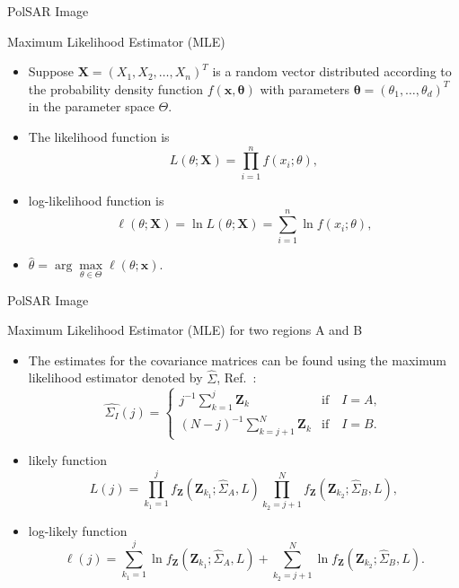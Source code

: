 \documentclass[10pt]{beamer}
\begin{document}
\begin{frame}[fragile]{PolSAR Image}
\begin{alertblock}{Maximum Likelihood Estimator (MLE)}
\begin{itemize}
	\item Suppose $\mathbf{X}=(X_1,X_2,\dots,X_n)^T$ is a random vector distributed according to the probability density function $f(\mathbf{x},\mathbf{\theta})$ with parameters $\mathbf{\theta}=(\theta_1,\dots,\theta_d)^T$ in the parameter space $\Theta$.
    \item The likelihood function is
\begin{equation*}
    L(\theta;\mathbf{X}) = \prod_{i=1}^{n}f(x_i;\theta),
\end{equation*}
    \item log-likelihood function is
\begin{equation}
	\ell(\theta;\mathbf{X})= \ln L(\theta;\mathbf{X}) = \sum_{i=1}^{n}\ln f(x_i;\theta),
	\label{eq_05}
\end{equation}
     \item $\widehat{\theta}= \arg\max\limits_{\theta\in\Theta}\ell(\theta;\mathbf{x})$.
\end{itemize}
\end{alertblock}
\end{frame}

\begin{frame}[fragile]{PolSAR Image}
\begin{alertblock}{Maximum Likelihood Estimator (MLE) for two regions A and B}
\begin{itemize}
\item The estimates for the covariance matrices can be found using the maximum likelihood estimator denoted by $\widehat{\Sigma}$, Ref.~\cite{good}: 
\begin{equation}
\widehat{\Sigma_{I}}(j) = \left\{
\begin{array}{lc}
	j^{-1}\sum_{k=1}^{j}\mathbf{Z}_{k}  & \mbox{if}\quad I=A,  \\
        (N-j)^{-1}\sum_{k=j+1}^{N}\mathbf{Z}_{k} & \mbox{if}\quad I=B.
\end{array}
\right.\label{eq_08}
\end{equation}
	\item likely function
	 \begin{equation}
	L(j)=\prod_{k_1=1}^{j}f_{\mathbf{Z}}(\mathbf{Z}_{k_1};\widehat\Sigma_{A},L) \prod_{k_2=j+1}^{N}f_{\mathbf{Z}}(\mathbf{Z}_{k_2};\widehat\Sigma_{B},L),
	\label{eq_06}
\end{equation}
    \item log-likely function
\begin{equation}
\ell(j) =
	\sum_{k_1=1}^{j}\ln f_{\mathbf{Z}}(\mathbf{Z}_{k_1}; \widehat\Sigma_{A},L) + \sum_{k_2=j+1}^{N}\ln f_{\mathbf{Z}}(\mathbf{Z}_{k_2}; \widehat\Sigma_{B},L).
	\label{eq_07}
\end{equation}
\end{itemize}
\end{alertblock}
\end{frame}
\end{document}
